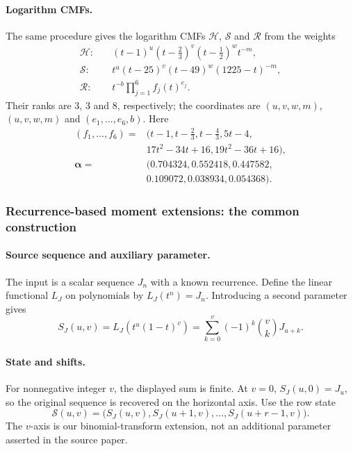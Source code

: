 \documentclass[oneside,english,11pt]{amsart}
\begin{document}
\smallskip
\paragraph{\textbf{Logarithm CMFs.}}
The same procedure gives the logarithm CMFs $\mathcal H$, $\mathcal S$ and $\mathcal R$ from the weights
\[
\begin{aligned}
\mathcal H:&\quad (t-1)^u(t-\tfrac23)^v(t-\tfrac12)^w t^{-m},\\
\mathcal S:&\quad t^u(t-25)^v(t-49)^w(1225-t)^{-m},\\
\mathcal R:&\quad t^{-b}\prod_{j=1}^6 f_j(t)^{e_j}.
\end{aligned}
\]
Their ranks are $3$, $3$ and $8$, respectively; the coordinates are
$(u,v,w,m)$, $(u,v,w,m)$ and $(e_1,\ldots,e_6,b)$. Here
\[
\begin{aligned}
(f_1,\ldots,f_6)={}&(t-1,t-\tfrac23,t-\tfrac43,5t-4,\\
&17t^2-34t+16,19t^2-36t+16),\\
\boldsymbol\alpha={}&(0.704324,0.552418,0.447582,\\
&0.109072,0.038934,0.054368).
\end{aligned}
\]

\subsubsection{Recurrence-based moment extensions: the common construction}
\label{app:auxiliary-moment-fields}
\smallskip
\paragraph{\textbf{Source sequence and auxiliary parameter.}}
The input is a scalar sequence $J_n$ with a known recurrence.
Define the linear functional $L_J$ on polynomials by $L_J(t^n)=J_n$.
Introducing a second parameter gives
\[
 S_J(u,v)=L_J(t^u(1-t)^v)
 =\sum_{k=0}^v(-1)^k\binom vk J_{u+k}.
\]
\smallskip
\paragraph{\textbf{State and shifts.}}
For nonnegative integer $v$, the displayed sum is finite. At $v=0$,
$S_J(u,0)=J_u$, so the original sequence is recovered on the horizontal
axis. Use the row state
\[
 \mathcal S(u,v)=\bigl(S_J(u,v),S_J(u+1,v),\ldots,S_J(u+r-1,v)\bigr).
\]
The $v$-axis is our binomial-transform extension, not an additional
parameter asserted in the source paper.
\end{document}

